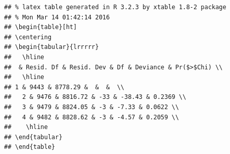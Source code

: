 \documentclass{article}\usepackage[]{graphicx}\usepackage[]{color}
\makeatletter
\newenvironment{kframe}{%
 \def\at@end@of@kframe{}%
 \ifinner\ifhmode%
  \def\at@end@of@kframe{\end{minipage}}%
  \begin{minipage}{\columnwidth}%
 \fi\fi%
 \def\FrameCommand##1{\hskip\@totalleftmargin \hskip-\fboxsep
 \colorbox{shadecolor}{##1}\hskip-\fboxsep
     \hskip-\linewidth \hskip-\@totalleftmargin \hskip\columnwidth}%
 \MakeFramed {\advance\hsize-\width
   \@totalleftmargin\z@ \linewidth\hsize
   \@setminipage}}%
 {\par\unskip\endMakeFramed%
 \at@end@of@kframe}
\newenvironment{knitrout}{}{} %
\makeatother
\begin{document}
\begin{knitrout}
\begin{kframe}
\begin{alltt}
\end{alltt}
\begin{verbatim}
## % latex table generated in R 3.2.3 by xtable 1.8-2 package
## % Mon Mar 14 01:42:14 2016
## \begin{table}[ht]
## \centering
## \begin{tabular}{lrrrrr}
##   \hline
##  & Resid. Df & Resid. Dev & Df & Deviance & Pr($>$Chi) \\ 
##   \hline
## 1 & 9443 & 8778.29 &  &  &  \\ 
##   2 & 9476 & 8816.72 & -33 & -38.43 & 0.2369 \\ 
##   3 & 9479 & 8824.05 & -3 & -7.33 & 0.0622 \\ 
##   4 & 9482 & 8828.62 & -3 & -4.57 & 0.2059 \\ 
##    \hline
## \end{tabular}
## \end{table}
\end{verbatim}
\end{kframe}
\end{knitrout}
\end{document}
